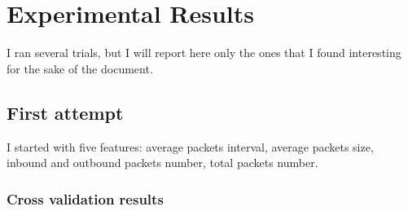 \documentclass[12pt, conference]{IEEEtran}
\begin{document}
\section{Experimental Results}

I ran several trials, but I will report here only the ones that I found interesting for the sake of the document.

\subsection{First attempt}
I started with five features: average packets interval, average packets size, inbound and outbound packets number, total packets number.

\subsubsection{Cross validation results}
\end{document}
